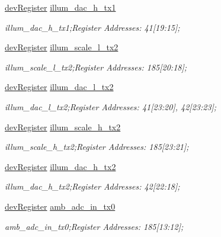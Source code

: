 \begin{DoxyCompactItemize}
\mbox{\hyperlink{classdev_register}{dev\+Register}} \mbox{\hyperlink{class_o_p_t3101_registers_a9c1ac7edc4f8160f3de285bbc9ad30c5}{illum\+\_\+dac\+\_\+h\+\_\+tx1}}
\begin{DoxyCompactList}\small\item\em illum\+\_\+dac\+\_\+h\+\_\+tx1;Register Addresses\+: 41\mbox{[}19\+:15\mbox{]}; \end{DoxyCompactList}\item 
\mbox{\hyperlink{classdev_register}{dev\+Register}} \mbox{\hyperlink{class_o_p_t3101_registers_a99b66171113470d64c4ff661b983db7e}{illum\+\_\+scale\+\_\+l\+\_\+tx2}}
\begin{DoxyCompactList}\small\item\em illum\+\_\+scale\+\_\+l\+\_\+tx2;Register Addresses\+: 185\mbox{[}20\+:18\mbox{]}; \end{DoxyCompactList}\item 
\mbox{\hyperlink{classdev_register}{dev\+Register}} \mbox{\hyperlink{class_o_p_t3101_registers_a17e9d4af3aca8c4c7e8691502522b965}{illum\+\_\+dac\+\_\+l\+\_\+tx2}}
\begin{DoxyCompactList}\small\item\em illum\+\_\+dac\+\_\+l\+\_\+tx2;Register Addresses\+: 41\mbox{[}23\+:20\mbox{]}, 42\mbox{[}23\+:23\mbox{]}; \end{DoxyCompactList}\item 
\mbox{\hyperlink{classdev_register}{dev\+Register}} \mbox{\hyperlink{class_o_p_t3101_registers_a4d219650c4b30544bb0324c821e136d5}{illum\+\_\+scale\+\_\+h\+\_\+tx2}}
\begin{DoxyCompactList}\small\item\em illum\+\_\+scale\+\_\+h\+\_\+tx2;Register Addresses\+: 185\mbox{[}23\+:21\mbox{]}; \end{DoxyCompactList}\item 
\mbox{\hyperlink{classdev_register}{dev\+Register}} \mbox{\hyperlink{class_o_p_t3101_registers_a72ddfb068412cdaa58147490bc037155}{illum\+\_\+dac\+\_\+h\+\_\+tx2}}
\begin{DoxyCompactList}\small\item\em illum\+\_\+dac\+\_\+h\+\_\+tx2;Register Addresses\+: 42\mbox{[}22\+:18\mbox{]}; \end{DoxyCompactList}\item 
\mbox{\hyperlink{classdev_register}{dev\+Register}} \mbox{\hyperlink{class_o_p_t3101_registers_a4def427ec474e4e0dacecdc15642d888}{amb\+\_\+adc\+\_\+in\+\_\+tx0}}
\begin{DoxyCompactList}\small\item\em amb\+\_\+adc\+\_\+in\+\_\+tx0;Register Addresses\+: 185\mbox{[}13\+:12\mbox{]}; \end{DoxyCompactList}\item 

\end{DoxyCompactItemize}
